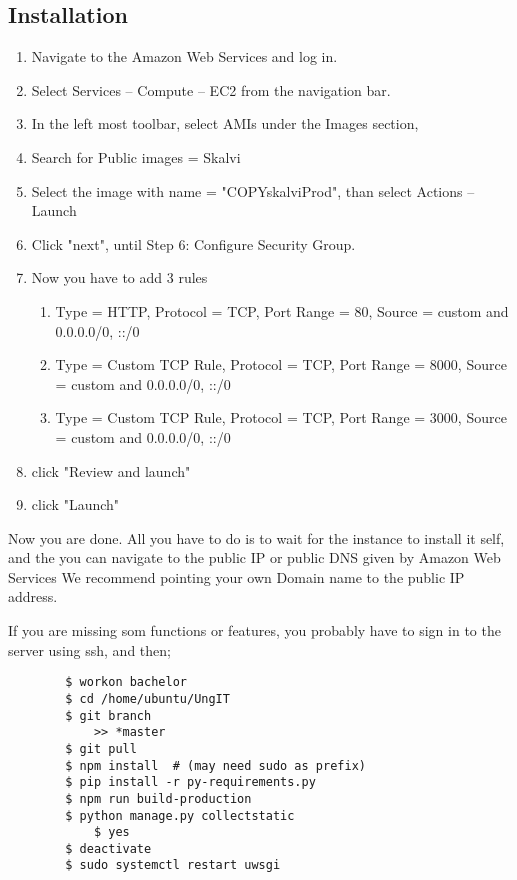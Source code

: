 \subsection{Installation}
\begin{enumerate}
    \item Navigate to the Amazon Web Services and log in.
    \item Select Services -- Compute -- EC2  from the navigation bar.
    \item In the left most toolbar, select AMIs under the Images section,
    \item Search for Public images =  Skalvi
    \item Select the image with name = "COPYskalviProd", than select  Actions -- Launch
    \item Click "next", until Step 6: Configure Security Group.
    \item Now you have to add 3 rules
    \begin{enumerate}
        \item Type = HTTP, Protocol = TCP, Port Range = 80, Source = custom and 0.0.0.0/0, ::/0
        \item Type = Custom TCP Rule, Protocol = TCP, Port Range = 8000, Source = custom and 0.0.0.0/0, ::/0
        \item Type = Custom TCP Rule, Protocol = TCP, Port Range = 3000, Source = custom and 0.0.0.0/0, ::/0
    \end{enumerate}
    \item click "Review and launch"
    \item click "Launch"
\end{enumerate}

Now you are done. All you have to do is to wait for the instance to install it self, and the you can navigate to the public IP or public DNS given by Amazon Web Services
We recommend pointing your own Domain name to the public IP address.


If you are missing som functions or features, you probably have to sign in to the server using ssh, and then;

\begin{lstlisting}
        $ workon bachelor
        $ cd /home/ubuntu/UngIT
        $ git branch
            >> *master
        $ git pull
        $ npm install  # (may need sudo as prefix)
        $ pip install -r py-requirements.py
        $ npm run build-production
        $ python manage.py collectstatic
            $ yes
        $ deactivate
        $ sudo systemctl restart uwsgi
            
    \end{lstlisting}

